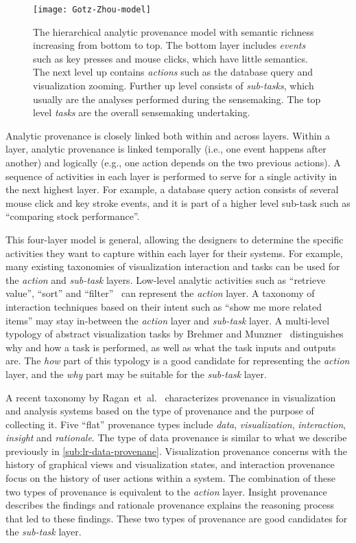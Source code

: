 \begin{figure}[!htb]
	\centering
	\texttt{[image: Gotz-Zhou-model]}
	\caption{The hierarchical analytic provenance model with semantic richness increasing from bottom to top. The bottom layer includes \emph{events} such as key presses and mouse clicks, which have little semantics. The next level up contains \emph{actions} such as the database query and visualization zooming. Further up level consists of \emph{sub-tasks}, which usually are the analyses performed during the sensemaking. The top level \emph{tasks} are the overall sensemaking undertaking. }
	\label{fig:lr-Gotz-Zhou-model}
\end{figure}

Analytic provenance is closely linked both within and across layers. Within a layer, analytic provenance is linked temporally (i.e., one event happens after another) and logically (e.g., one action depends on the two previous actions). A sequence of activities in each layer is performed to serve for a single activity in the next highest layer. For example, a database query action consists of several mouse click and key stroke events, and it is part of a higher level sub-task such as ``comparing stock performance''.

This four-layer model is general, allowing the designers to determine the specific activities they want to capture within each layer for their systems. For example, many existing taxonomies of visualization interaction and tasks can be used for the \emph{action} and \emph{sub-task} layers. Low-level analytic activities such as ``retrieve value'', ``sort'' and ``filter''~\cite{Amar2005, Gotz2009} can represent the \emph{action} layer. A taxonomy of interaction techniques based on their intent such as ``show me more related items'' may stay in-between the \emph{action} layer and \emph{sub-task} layer. A multi-level typology of abstract visualization tasks by Brehmer and Munzner~\cite{Brehmer2013} distinguishes why and how a task is performed, as well as what the task inputs and outputs are. The \emph{how} part of this typology is a good candidate for representing the \emph{action} layer, and the \emph{why} part may be suitable for the \emph{sub-task} layer.

A recent taxonomy by Ragan~et~al.~\cite{Ragan2016} characterizes provenance in visualization and analysis systems based on the type of provenance and the purpose of collecting it. Five ``flat'' provenance types include \emph{data}, \emph{visualization}, \emph{interaction}, \emph{insight} and \emph{rationale}. The type of data provenance is similar to what we describe previously in \autoref{sub:lr-data-provenane}. Visualization provenance concerns with the history of graphical views and visualization states, and interaction provenance focus on the history of user actions within a system. The combination of these two types of provenance is equivalent to the \emph{action} layer. Insight provenance describes the findings and rationale provenance explains the reasoning process that led to these findings. These two types of provenance are good candidates for the \emph{sub-task} layer.

